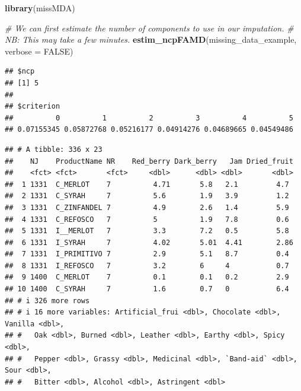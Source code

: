 \documentclass[
]{book}
\newenvironment{Shaded}{\begin{snugshade}}{\end{snugshade}}
\newcommand{\AttributeTok}[1]{\textcolor[rgb]{0.13,0.29,0.53}{#1}}
\newcommand{\CommentTok}[1]{\textcolor[rgb]{0.56,0.35,0.01}{\textit{#1}}}
\newcommand{\ConstantTok}[1]{\textcolor[rgb]{0.56,0.35,0.01}{#1}}
\newcommand{\DecValTok}[1]{\textcolor[rgb]{0.00,0.00,0.81}{#1}}
\newcommand{\FunctionTok}[1]{\textcolor[rgb]{0.13,0.29,0.53}{\textbf{#1}}}
\newcommand{\NormalTok}[1]{#1}
\newcommand{\OtherTok}[1]{\textcolor[rgb]{0.56,0.35,0.01}{#1}}
\newcommand{\SpecialCharTok}[1]{\textcolor[rgb]{0.81,0.36,0.00}{\textbf{#1}}}
\begin{document}
\begin{Shaded}
\begin{Highlighting}[]
\FunctionTok{library}\NormalTok{(missMDA)}

\CommentTok{\# We can first estimate the number of components to use in our imputation.}
\CommentTok{\# NB: This may take a few minutes.}
\FunctionTok{estim\_ncpFAMD}\NormalTok{(missing\_data\_example, }\AttributeTok{verbose =} \ConstantTok{FALSE}\NormalTok{)}
\end{Highlighting}
\end{Shaded}

\begin{verbatim}
## $ncp
## [1] 5
## 
## $criterion
##          0          1          2          3          4          5 
## 0.07155345 0.05872768 0.05216177 0.04914276 0.04689665 0.04549486
\end{verbatim}

\begin{Shaded}
\end{Shaded}

\begin{verbatim}
## # A tibble: 336 x 23
##    NJ    ProductName NR    Red_berry Dark_berry   Jam Dried_fruit
##    <fct> <fct>       <fct>     <dbl>      <dbl> <dbl>       <dbl>
##  1 1331  C_MERLOT    7          4.71       5.8   2.1         4.7 
##  2 1331  C_SYRAH     7          5.6        1.9   3.9         1.2 
##  3 1331  C_ZINFANDEL 7          4.9        2.6   1.4         5.9 
##  4 1331  C_REFOSCO   7          5          1.9   7.8         0.6 
##  5 1331  I__MERLOT   7          3.3        7.2   0.5         5.8 
##  6 1331  I_SYRAH     7          4.02       5.01  4.41        2.86
##  7 1331  I_PRIMITIVO 7          2.9        5.1   8.7         0.4 
##  8 1331  I_REFOSCO   7          3.2        6     4           0.7 
##  9 1400  C_MERLOT    7          0.1        0.1   0.2         2.9 
## 10 1400  C_SYRAH     7          1.6        0.7   0           6.4 
## # i 326 more rows
## # i 16 more variables: Artificial_frui <dbl>, Chocolate <dbl>, Vanilla <dbl>,
## #   Oak <dbl>, Burned <dbl>, Leather <dbl>, Earthy <dbl>, Spicy <dbl>,
## #   Pepper <dbl>, Grassy <dbl>, Medicinal <dbl>, `Band-aid` <dbl>, Sour <dbl>,
## #   Bitter <dbl>, Alcohol <dbl>, Astringent <dbl>
\end{verbatim}
\end{document}
